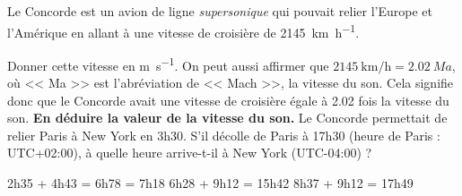 \documentclass[../Cours.tex]{subfiles}
\begin{document}
\begin{questions}
    \exercice Le Concorde est un avion de ligne \emph{supersonique} qui pouvait relier l'Europe et l'Amérique en allant à une vitesse de croisière de \qty{2145}{\kilo\metre\per\hour}.

    \question Donner cette vitesse en \unit{\metre\per\second}.
    \question On peut aussi affirmer que $\qty{2145}{\kilo\metre\per\hour} = \qty{2.02}{Ma}$, où << Ma >> est l'abréviation de << Mach >>, la vitesse du son. Cela signifie donc que le Concorde avait une vitesse de croisière égale à \num{2.02} fois la vitesse du son. \textbf{En déduire la valeur de la vitesse du son.}
    \question Le Concorde permettait de relier Paris à New York en 3h30. S'il décolle de Paris à 17h30 (heure de Paris : UTC+02:00), à quelle heure arrive-t-il à New York (UTC-04:00) ?
\end{questions}

\clearpage
\CORRECTIONS
\begin{questions}
    \exercice
    \question 2h35 + 4h43 = 6h78 = 7h18
    \question 6h28 + 9h12 = 15h42
    \question 8h37 + 9h12 = 17h49

    
\end{questions}
\end{document}
